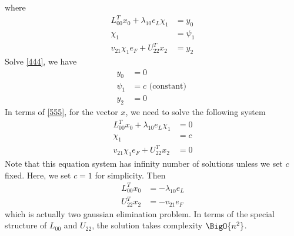 \documentclass[11pt,a4paper]{article}
\begin{document}
where 
\begin{equation} \label{555}
    \begin{aligned}
    L_{00}^T x_{0} + \lambda_{10} e_L \chi_1 &= y_0 \\
    \chi_1 &= \psi_1  \\
    v_{21}\chi_1 e_F + U_{22}^T x_{2} &= y_2
    \end{aligned}
\end{equation}
Solve \eqref{444}, we have
\begin{equation} 
    \begin{aligned}
    y_0 &= 0 \\
    \psi_1 &= c \text{ (constant) } \\
    y_2 &= 0
    \end{aligned}
\end{equation}
In terms of \eqref{555}, for the vector $x$, we need to solve the following system
\begin{equation} 
    \begin{aligned}
    L_{00}^T x_{0} + \lambda_{10} e_L \chi_1 &= 0 \\
    \chi_1 &= c  \\
    v_{21}\chi_1 e_F + U_{22}^T x_{2} &= 0
    \end{aligned}
\end{equation}
Note that this equation system has infinity number of solutions unless we set
$c$ fixed. Here, we set $c = 1$ for simplicity. Then
\begin{align}
    L_{00}^T x_{0} &= - \lambda_{10} e_L   \\
    U_{22}^T x_{2} &= - v_{21} e_F 
\end{align}
which is actually two gaussian elimination problem. In terms of the special
structure of $L_{00}$ and $U_{22}$, the solution takes complexity $\BigO{n^2}$.

\end{document}
